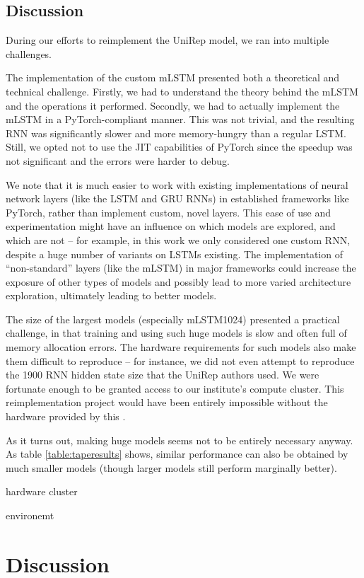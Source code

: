 \documentclass[a4paper,12pt]{article}
\begin{document}
\subsection{Discussion}
During our efforts to reimplement the UniRep model, we ran into multiple challenges.

The implementation of the custom mLSTM presented both a theoretical and technical challenge. Firstly, we had to understand the theory behind the mLSTM and the operations it performed. Secondly, we had to actually implement the mLSTM in a PyTorch-compliant manner. This was not trivial, and the resulting RNN was significantly slower and more memory-hungry than a regular LSTM. Still, we opted not to use the JIT capabilities of PyTorch since the speedup was not significant and the errors were harder to debug.

We note that it is much easier to work with existing implementations of neural network layers (like the LSTM and GRU RNNs) in established frameworks like PyTorch, rather than implement custom, novel layers. This ease of use and experimentation might have an influence on which models are explored, and which are not -- for example, in this work we only considered one custom RNN, despite a huge number of variants on LSTMs existing. The implementation of ``non-standard'' layers (like the mLSTM) in major frameworks could increase the exposure of other types of models and possibly lead to more varied architecture exploration, ultimately leading to better models.

The size of the largest models (especially mLSTM1024) presented a practical challenge, in that training and using such huge models is slow and often full of memory allocation errors. The hardware requirements for such models also make them difficult to reproduce -- for instance, we did not even attempt to reproduce the 1900 RNN hidden state size that the UniRep authors used. We were fortunate enough to be granted access to our institute's compute cluster. This reimplementation project would have been entirely impossible without the hardware provided by this .

As it turns out, making huge models seems not to be entirely necessary anyway. As table \ref{table:taperesults} shows, similar performance can also be obtained by much smaller models (though larger models still perform marginally better).

hardware cluster

environemt

\clearpage
\section{Discussion}
\end{document}
